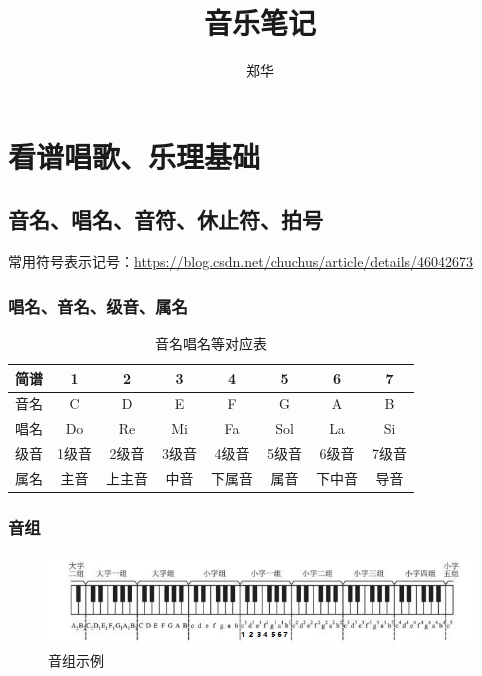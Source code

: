 \documentclass[UTF8,a4paper,12pt]{ctexbook}
\author{\kaishu 郑华}
\title{\heiti 音乐笔记}
\begin{document}
 	\maketitle
 
\chapter{看谱唱歌、乐理基础}
	\section{音名、唱名、音符、休止符、拍号}
	 	常用符号表示记号：\url{https://blog.csdn.net/chuchus/article/details/46042673}
	 	
		\subsection*{唱名、音名、级音、属名}
		 	
		 	\begin{table}[H]
		 		\centering
		 		\caption{音名唱名等对应表}
		 		\begin{tabular}{c|c|c|c|c|c|c|c}
		 		\toprule
		 			简谱 & 1 		& 2 & 3 & 4 & 5 & 6 & 7 \\
		 		\midrule
		 			音名 & C 		&D 	&E& F &G &A &B \\
		 			唱名 & Do 	&Re &Mi &Fa &Sol& La& Si \\
		 			级音 & 1级音  	& 2级音 & 3级音 & 4级音 & 5级音 & 6级音 & 7级音\\
		 			属名 & 主音 	& 上主音 &中音 & 下属音 & 属音 & 下中音 & 导音\\
		 		\bottomrule
		 		\end{tabular}
		 	\end{table}
		
		
		\subsection*{音组}
			\begin{figure}[H]
				\centering
				\includegraphics[width=16cm]{yinzu}
				\caption{音组示例}
			\end{figure}	
		
\end{document}
